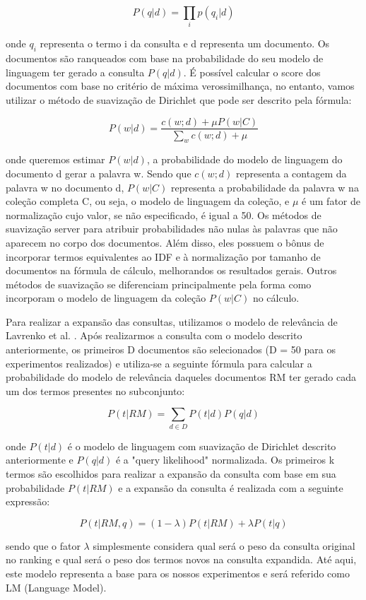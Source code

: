 \documentclass{article}
\begin{document}
\[
P(q|d) = \prod_{i}p(q_i|d)
\]

onde $ q_i $ representa o termo i da consulta e d representa um documento. Os documentos são ranqueados com base na 
probabilidade do seu modelo de linguagem ter gerado a consulta $ P(q|d) $. É possível calcular o score dos documentos
com base no critério de máxima verossimilhança, no entanto, vamos utilizar o método de suavização de Dirichlet \cite{lafferty2001} 
que pode ser descrito pela fórmula:

\[
P(w|d) = \frac{c(w;d) + \mu P(w|C)}{\sum_w c(w;d) + \mu}
\]

onde queremos estimar $ P(w|d) $, a probabilidade do modelo de linguagem do documento d gerar a palavra w. Sendo que $ c(w;d) $ 
representa a contagem da palavra w no documento d, $ P(w|C) $ representa a probabilidade da palavra w na coleção completa C, ou seja, 
o modelo de linguagem da coleção, e $ \mu $ é um fator de normalização cujo valor, se não especificado, é igual a 50. Os métodos de 
suavização server para atribuir probabilidades não nulas às palavras que não aparecem no corpo dos documentos. Além disso, eles
possuem o bônus de incorporar termos equivalentes ao IDF e à normalização por tamanho de documentos na fórmula de cálculo,
melhorandos os resultados gerais. Outros métodos de suavização se diferenciam principalmente pela forma como incorporam o 
modelo de linguagem da coleção $ P(w|C) $ no cálculo.

Para realizar a expansão das consultas, utilizamos o modelo de relevância de Lavrenko et al. \cite{lavrenko2001}. Após realizarmos
a consulta com o modelo descrito anteriormente, os primeiros D documentos são selecionados (D = 50 para os experimentos realizados)
e utiliza-se a seguinte fórmula para calcular a probabilidade do modelo de relevância daqueles documentos RM ter gerado cada um dos 
termos presentes no subconjunto:

\[
P(t|RM) = \sum_{d \in D} P(t|d)P(q|d)
\]

onde $ P(t|d) $ é o modelo de linguagem com suavização de Dirichlet descrito anteriormente e $ P(q|d) $ é a "query likelihood"
normalizada. Os primeiros k termos são escolhidos para realizar a expansão da consulta com base em sua probabilidade $ P(t|RM) $
e a expansão da consulta é realizada com a seguinte expressão:

\[
P(t|RM,q) = (1-\lambda) P(t|RM) + \lambda P(t|q)
\]

sendo que o fator $ \lambda $ simplesmente considera qual será o peso da consulta original no ranking e qual será o peso dos 
termos novos na consulta expandida. Até aqui, este modelo representa a base para os nossos experimentos e será referido como
LM (Language Model).
\end{document}
